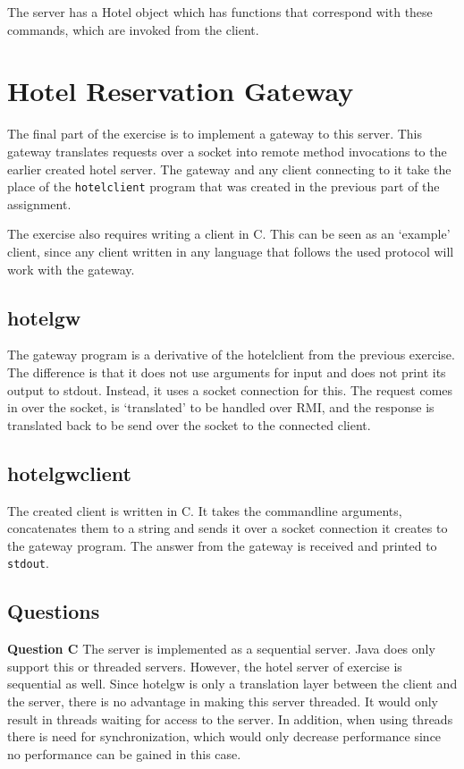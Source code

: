 \documentclass[a4paper]{article}
\begin{document}
The server has a Hotel object which has functions that correspond with these commands, 
which are invoked from the client.

\section{Hotel Reservation Gateway}

The final part of the exercise is to implement a gateway to this server. This gateway
translates requests over a socket into remote method invocations to the earlier created
hotel server. The gateway and any client connecting to it take the place of the 
\texttt{hotelclient} program that was created in the previous part of the assignment.

The exercise also requires writing a client in C. This can be seen as an `example' client,
since any client written in any language that follows the used protocol will work with 
the gateway.

\subsection{hotelgw}

The gateway program is a derivative of the hotelclient from the previous exercise. The
difference is that it does not use arguments for input and does not print its output to
stdout. Instead, it uses a socket connection for this. The request comes in over the 
socket, is `translated' to be handled over RMI, and the response is translated back to be
send over the socket to the connected client.

\subsection{hotelgwclient}

The created client is written in C. It takes the commandline arguments, concatenates them
to a string and sends it over a socket connection it creates to the gateway program. The
answer from the gateway is received and printed to \texttt{stdout}.

\subsection{Questions}

\textbf{Question C} The server is implemented as a sequential server. Java does only 
support this or threaded servers. However, the hotel server of exercise is sequential as 
well. Since hotelgw is only a translation layer between the client and the server, there
is no advantage in making this server threaded. It would only result in threads
waiting for access to the server. In addition, when using threads there is need for
synchronization, which would only decrease performance since no performance can be gained
in this case.
\end{document}
